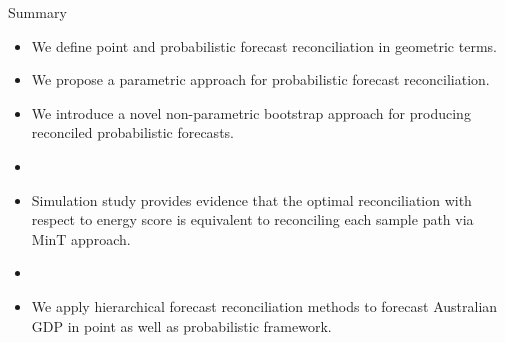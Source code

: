 \documentclass[11pt,xcolor=dvipsnames,table]{beamer} %
\begin{document}
\begin{frame}[noframenumbering]{Summary}
	\begin{itemize}[<+-| alert@+>]
		\item We define point and probabilistic forecast reconciliation in geometric terms.
		\item We propose a parametric approach for probabilistic forecast reconciliation. 
		
		\item We introduce a novel non-parametric bootstrap approach for producing reconciled probabilistic forecasts.
		\item[]
		\item Simulation study provides evidence that the optimal reconciliation with respect to energy score is equivalent to reconciling each sample path via MinT approach.
		\item[]
		\item We apply hierarchical forecast reconciliation methods to forecast Australian GDP in point as well as probabilistic framework.
		
	\end{itemize}
\end{frame}
\end{document}
